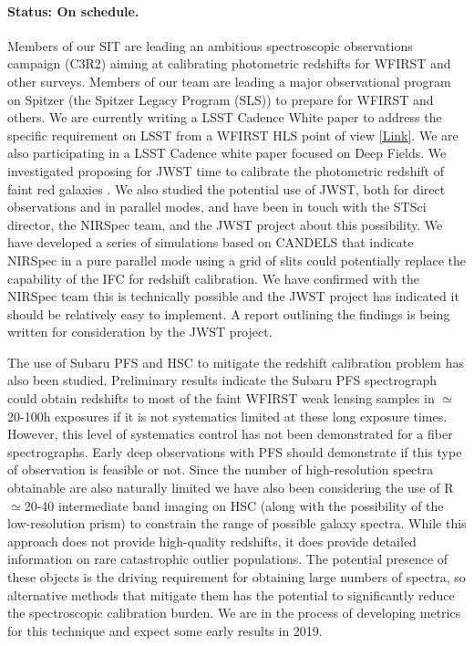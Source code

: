 \paragraph*{Status: On schedule.} Members of our SIT are leading an ambitious spectroscopic observations campaign (C3R2) aiming at calibrating photometric redshifts
for WFIRST and other surveys. Members of our team are leading a major
observational program on Spitzer (the Spitzer Legacy Program (SLS)) to prepare for WFIRST and others. We are currently writing a LSST Cadence White paper to address the specific requirement on LSST from a WFIRST HLS point of view  \href{https://www.lsst.org/call-whitepaper-2018}{[Link]}. We are also participating in a LSST Cadence white paper focused on Deep Fields. We investigated proposing for JWST time to calibrate the photometric redshift of faint red galaxies \citep{Hemmati:2018}. We also studied the potential use of JWST, both for direct observations and in parallel modes, and have been in touch with the STSci director, the NIRSpec team,  and the JWST project about this possibility.  We have developed a series of simulations based on CANDELS that indicate NIRSpec in a pure parallel mode using a grid of slits could potentially replace the capability of the IFC for redshift calibration.  We have confirmed with the NIRSpec team this is technically possible and the JWST project has indicated it should be relatively easy to implement.  A report outlining the findings is being written for consideration by the JWST project.

The use of Subaru PFS and HSC to mitigate the redshift calibration problem has
also been studied.  Preliminary results indicate the Subaru PFS spectrograph
could obtain redshifts to most of the faint WFIRST weak lensing samples in
$\simeq$20-100h exposures if it is not systematics limited at these long
exposure times.  However, this level of systematics control has not been
demonstrated for a fiber spectrographs.  Early deep observations with PFS should
demonstrate if this type of observation is feasible or not.  Since the number of
high-resolution spectra obtainable are also naturally limited we have also been
considering the use of R$\simeq$20-40 intermediate band imaging on HSC (along with the
possibility of the low-resolution prism) to constrain the range of possible
galaxy spectra.  While this approach does not provide high-quality redshifts, it
does provide detailed information on rare catastrophic outlier populations.  The
potential presence of these objects is the driving requirement for obtaining
large numbers of spectra, so alternative methods that mitigate them has the
potential to significantly reduce the spectroscopic calibration burden.  We are
in the process of developing metrics for this technique and expect some early
results in 2019.

